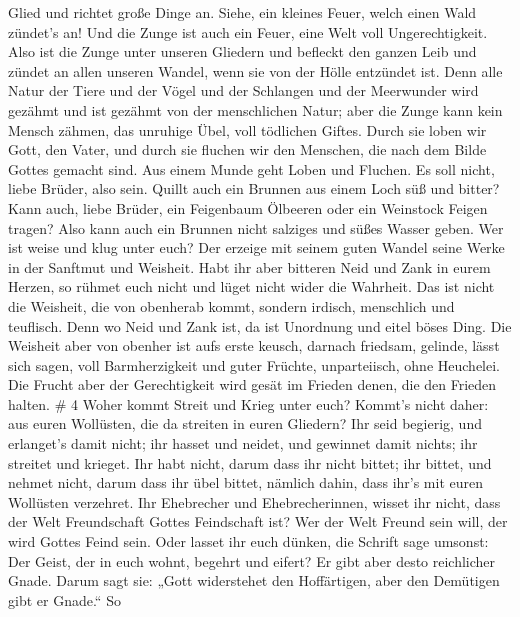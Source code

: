 Glied und richtet große Dinge an. Siehe, ein kleines Feuer, welch einen
Wald zündet's an!  Und die Zunge ist auch ein Feuer, eine
Welt voll Ungerechtigkeit. Also ist die Zunge unter unseren Gliedern und
befleckt den ganzen Leib und zündet an allen unseren Wandel, wenn sie
von der Hölle entzündet ist.  Denn alle Natur der Tiere und
der Vögel und der Schlangen und der Meerwunder wird gezähmt und ist
gezähmt von der menschlichen Natur;  aber die Zunge kann
kein Mensch zähmen, das unruhige Übel, voll tödlichen Giftes.
 Durch sie loben wir Gott, den Vater, und durch sie fluchen
wir den Menschen, die nach dem Bilde Gottes gemacht sind. 
Aus einem Munde geht Loben und Fluchen. Es soll nicht, liebe Brüder,
also sein.  Quillt auch ein Brunnen aus einem Loch süß und
bitter?  Kann auch, liebe Brüder, ein Feigenbaum Ölbeeren
oder ein Weinstock Feigen tragen? Also kann auch ein Brunnen nicht
salziges und süßes Wasser geben.  Wer ist weise und klug
unter euch? Der erzeige mit seinem guten Wandel seine Werke in der
Sanftmut und Weisheit.  Habt ihr aber bitteren Neid und
Zank in eurem Herzen, so rühmet euch nicht und lüget nicht wider die
Wahrheit.  Das ist nicht die Weisheit, die von obenherab
kommt, sondern irdisch, menschlich und teuflisch.  Denn wo
Neid und Zank ist, da ist Unordnung und eitel böses Ding. 
Die Weisheit aber von obenher ist aufs erste keusch, darnach friedsam,
gelinde, lässt sich sagen, voll Barmherzigkeit und guter Früchte,
unparteiisch, ohne Heuchelei.  Die Frucht aber der
Gerechtigkeit wird gesät im Frieden denen, die den Frieden halten. \# 4
 Woher kommt Streit und Krieg unter euch? Kommt's nicht
daher: aus euren Wollüsten, die da streiten in euren Gliedern?
 Ihr seid begierig, und erlanget's damit nicht; ihr hasset
und neidet, und gewinnet damit nichts; ihr streitet und krieget. Ihr
habt nicht, darum dass ihr nicht bittet;  ihr bittet, und
nehmet nicht, darum dass ihr übel bittet, nämlich dahin, dass ihr's mit
euren Wollüsten verzehret.  Ihr Ehebrecher und
Ehebrecherinnen, wisset ihr nicht, dass der Welt Freundschaft Gottes
Feindschaft ist? Wer der Welt Freund sein will, der wird Gottes Feind
sein.  Oder lasset ihr euch dünken, die Schrift sage
umsonst: Der Geist, der in euch wohnt, begehrt und eifert? 
Er gibt aber desto reichlicher Gnade. Darum sagt sie: „Gott widerstehet
den Hoffärtigen, aber den Demütigen gibt er Gnade.``  So
